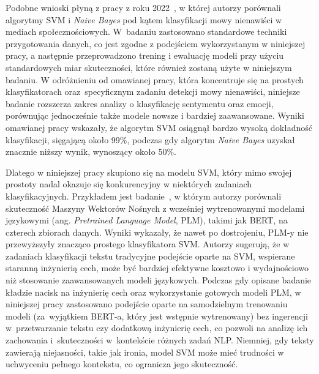Podobne wnioski płyną z pracy z roku 2022~\cite{HateClassification}, w której autorzy porównali algorytmy SVM i \textit{Naive Bayes} pod kątem klasyfikacji mowy nienawiści w mediach społecznościowych. W~badaniu zastosowano standardowe techniki przygotowania danych, co jest zgodne z podejściem wykorzystanym w niniejszej pracy, a następnie przeprowadzono trening i ewaluację modeli przy użyciu standardowych miar skuteczności, które również zostaną użyte w niniejszym badaniu. W odróżnieniu od omawianej pracy, która koncentruje się na prostych klasyfikatorach oraz~specyficznym zadaniu detekcji mowy nienawiści, niniejsze badanie rozszerza zakres analizy o klasyfikację sentymentu oraz emocji, porównując jednocześnie także modele nowsze i bardziej zaawansowane. Wyniki omawianej pracy wskazały, że algorytm SVM osiągnął bardzo wysoką dokładność klasyfikacji, sięgającą około 99\%, podczas gdy algorytm \textit{Naive Bayes} uzyskał znacznie niższy wynik, wynoszący około 50\%.

Dlatego w niniejszej pracy skupiono się na modelu SVM, który mimo swojej prostoty nadal okazuje się konkurencyjny w niektórych zadaniach klasyfikacyjnych. Przykładem jest badanie~\cite{PLMsvsSVM}, w którym autorzy porównali skuteczność Maszyny Wektorów Nośnych z wcześniej wytrenowanymi modelami językowymi (ang. \textit{Pretrained Language Model}, PLM), takimi jak BERT, na czterech zbiorach danych. Wyniki wykazały, że nawet po dostrojeniu, PLM-y nie przewyższyły znacząco prostego klasyfikatora SVM. Autorzy sugerują, że w zadaniach klasyfikacji tekstu tradycyjne podejście oparte na SVM, wspierane staranną inżynierią cech, może być bardziej efektywne kosztowo i wydajnościowo niż stosowanie zaawansowanych modeli językowych. Podczas gdy opisane badanie kładzie nacisk na inżynierię cech oraz wykorzystanie gotowych modeli PLM, w niniejszej pracy zastosowano podejście oparte na samodzielnym trenowaniu modeli (za~wyjątkiem BERT-a, który jest wstępnie wytrenowany) bez ingerencji w~przetwarzanie tekstu czy dodatkową inżynierię cech, co pozwoli na analizę ich zachowania i~skuteczności w~kontekście różnych zadań NLP. Niemniej, gdy teksty zawierają niejasności, takie jak ironia, model SVM może mieć trudności w uchwyceniu pełnego kontekstu, co ogranicza jego skuteczność.

